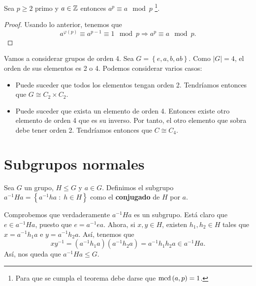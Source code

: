 \begin{colorary}
Sea $\displaystyle p \geq 2 $ primo y $\displaystyle a \in \mathbb{Z} $ entonces $\displaystyle a ^{p} \equiv a \mod p $ \footnote{Para que se cumpla el teorema debe darse que $\displaystyle \text{mcd}\left(a,p\right)=1 $.}.
\end{colorary}
\begin{proof}
Usando lo anterior, tenemos que
\[a^{\varphi\left(p\right)} \equiv a^{p-1} \equiv 1 \mod p \Rightarrow a^{p} \equiv a \mod p .\]
\end{proof}
\begin{eg}
	Vamos a considerar grupos de orden 4. Sea $\displaystyle G = \left\{ e, a, b, ab\right\}  $. Como $\displaystyle \left|G\right| = 4 $, el orden de sus elementos es 2 o 4. Podemos considerar varios casos:
	\begin{itemize}
	\item Puede suceder que todos los elementos tengan orden 2. Tendríamos entonces que $\displaystyle G \cong C_{2} \times C_{2} $.
	\item Puede suceder que exista un elemento de orden 4. Entonces existe otro elemento de orden 4 que es su inverso. Por tanto, el otro elemento que sobra debe tener orden 2. Tendríamos entonces que $\displaystyle C \cong C_{4} $.
	\end{itemize}
\end{eg}
\section{Subgrupos normales}
\begin{definition}
	Sea $\displaystyle G $ un grupo, $\displaystyle H \leq G $ y $\displaystyle a \in G $. Definimos el subgrupo $\displaystyle a^{-1}Ha = \left\{ a^{-1}ha \; : \; h \in H\right\}  $ como el \textbf{conjugado} de $\displaystyle H $ por $\displaystyle a $.
\end{definition}
\begin{observation}
Comprobemos que verdaderamente $\displaystyle a^{-1}Ha $ es un subgrupo. Está claro que $\displaystyle e \in a^{-1}Ha $, puesto que $\displaystyle e = a^{-1}ea $. Ahora, si $\displaystyle x,y \in H $, existen $\displaystyle h_{1}, h_{2} \in H $ tales que $\displaystyle x = a^{-1}h_{1}a $ e $\displaystyle y = a^{-1}h_{2}a $. Así, tenemos que
\[xy^{-1} = \left(a^{-1}h_{1}a\right)\left(a^{-1}h_{2}a\right) = a^{-1}h_{1}h_{2}a \in a^{-1}Ha .\]
Así, nos queda que $\displaystyle a^{-1}Ha \leq G $.
\end{observation}


